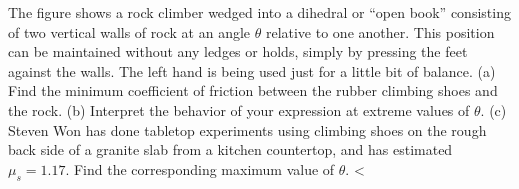 The figure shows a rock climber wedged into a dihedral or ``open book'' consisting
of two vertical walls of rock at an angle $\theta$ relative to one another.
This position can be maintained without any ledges or holds, simply by pressing
the feet against the walls. The left hand is being used just for a little bit
of balance. (a) Find the minimum coefficient of friction between the rubber climbing
shoes and the rock. (b) Interpret the behavior of your expression at extreme values of
$\theta$. (c) Steven Won has done tabletop experiments using climbing shoes on the
rough back side of a granite slab from a kitchen countertop, and has estimated
$\mu_s=1.17$. Find the corresponding maximum value of $\theta$.
        <%
